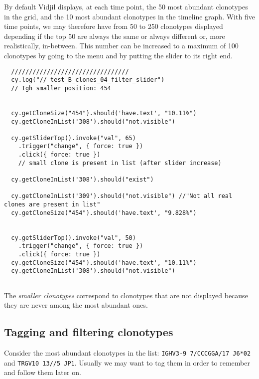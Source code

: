 By default Vidjil displays, at each time point, the 50 most abundant clonotypes in the grid, and the 10 most abundant clonotypes in the timeline graph.
With five time points, we may therefore have from 50 to 250 clonotypes displayed
depending if the top 50 are always the same or always different or, more
realistically, in-between.
This number can be increased to a maximum of 100 clonotypes by going to the  menu and by putting the
slider to its right end.

\begin{verbatim}
  /////////////////////////////////
  cy.log("// test_B_clones_04_filter_slider")
  // Igh smaller position: 454


  cy.getCloneSize("454").should('have.text', "10.11%")
  cy.getCloneInList('308').should("not.visible")

  cy.getSliderTop().invoke("val", 65)
    .trigger("change", { force: true })
    .click({ force: true })
    // small clone is present in list (after slider increase)

  cy.getCloneInList('308').should("exist")

  cy.getCloneInList('309').should("not.visible") //"Not all real clones are present in list"
  cy.getCloneSize("454").should('have.text', "9.828%")


  cy.getSliderTop().invoke("val", 50)
    .trigger("change", { force: true })
    .click({ force: true })
  cy.getCloneSize("454").should('have.text', "10.11%")
  cy.getCloneInList('308').should("not.visible")


\end{verbatim}

The \textit{smaller clonotypes} correspond to clonotypes that are not displayed
because they are never among the most abundant ones.


\subsection{Tagging and filtering clonotypes}

Consider the most abundant clonotypes in the list:  \texttt{IGHV3-9 7/CCCGGA/17 J6*02} and  \texttt{TRGV10 13//5 JP1}.
Usually we may want to tag them in order to remember and follow them later on.

